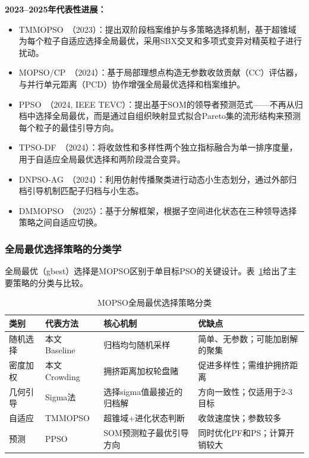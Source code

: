 \textbf{2023--2025年代表性进展：}
\begin{itemize}
    \item TMMOPSO~\cite{Liu2023}（2023）：提出双阶段档案维护与多策略选择机制，基于超锥域为每个粒子自适应选择全局最优，采用SBX交叉和多项式变异对精英粒子进行扰动。
    \item MOPSO/CP~\cite{Zhang2024}（2024）：基于局部理想点构造无参数收敛贡献（CC）评估器，与并行单元距离（PCD）协作增强全局最优选择和档案维护。
    \item PPSO~\cite{Wang2024}（2024, IEEE TEVC）：提出基于SOM的领导者预测范式——不再从归档中选择全局最优，而是通过自组织映射显式拟合Pareto集的流形结构来预测每个粒子的最佳引导方向。
    \item TPSO-DF~\cite{Xu2024}（2024）：将收敛性和多样性两个独立指标融合为单一排序度量，用于自适应全局最优选择和两阶段混合变异。
    \item DNPSO-AG~\cite{Sun2024}（2024）：利用仿射传播聚类进行动态小生态划分，通过外部归档引导机制匹配子归档与小生态。
    \item DMMOPSO~\cite{Ma2025}（2025）：基于分解框架，根据子空间进化状态在三种领导选择策略之间自适应切换。
\end{itemize}

\subsubsection{全局最优选择策略的分类学}

全局最优（gbest）选择是MOPSO区别于单目标PSO的关键设计。表~\ref{tab:leader_taxonomy}给出了主要策略的分类与比较。

\begin{table}[h]
\centering
\caption{MOPSO全局最优选择策略分类}
\label{tab:leader_taxonomy}
\begin{tabular}{p{2cm}p{1.8cm}p{2.5cm}p{2cm}}
\toprule
\textbf{类别} & \textbf{代表方法} & \textbf{核心机制} & \textbf{优缺点} \\
\midrule
随机选择 & 本文Baseline~\cite{Coello2004} & 归档均匀随机采样 & 简单、无参数；可能加剧解的聚集 \\
\hline
密度加权 & 本文Crowding\cite{Raquel2005} & 拥挤距离加权轮盘赌 & 促进多样性；需维护拥挤距离 \\
\hline
几何引导 & Sigma法\cite{Mostaghim2003} & 选择sigma值最接近的归档解 & 方向一致性；仅适用于2-3目标 \\
\hline
自适应 & TMMOPSO\cite{Liu2023} & 超锥域+进化状态判断 & 收敛速度快；参数较多 \\
\hline
预测 & PPSO\cite{Wang2024} & SOM预测粒子最优引导方向 & 同时优化PF和PS；计算开销较大 \\
\bottomrule
\end{tabular}
\end{table}

